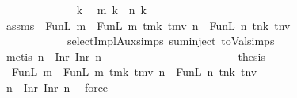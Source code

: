 \begin{isabellebody}
\ \ \ \ \ \ \ \ \ \ \ \ \isamarkupfalse%
\ k\ \isamarkupfalse%
\ {\isachardoublequoteopen}m{\isacharprime}{\kern0pt}{\isacharprime}{\kern0pt}\ k\ {\isacharequal}{\kern0pt}\ n{\isacharprime}{\kern0pt}{\isacharprime}{\kern0pt}\ k{\isachardoublequoteclose}\isanewline
\ \ \ \ \ \ \ \ \ \ \ \ \isamarkupfalse%
\ assms{\isacharparenleft}{\kern0pt}{}{\isacharparenright}{\kern0pt}\ {}\ FunL\ {\isacartoucheopen}m{\isacharprime}{\kern0pt}\ {\isacharequal}{\kern0pt}\ FunL\ m{\isacharprime}{\kern0pt}{\isacharprime}{\kern0pt}\ tmk\ tmv{\isacartoucheclose}\ {\isacartoucheopen}n{\isacharprime}{\kern0pt}\ {\isacharequal}{\kern0pt}\ FunL\ n{\isacharprime}{\kern0pt}{\isacharprime}{\kern0pt}\ tnk\ tnv{\isacartoucheclose}\isanewline
\ \ \ \ \ \ \ \ \ \ \ \ selectImplAux{\isachardot}{\kern0pt}simps{\isacharparenleft}{\kern0pt}{}{\isacharparenright}{\kern0pt}\ sum{\isachardot}{\kern0pt}inject{\isacharparenleft}{\kern0pt}{}{\isacharparenright}{\kern0pt}\ toVal{}{}{}{}{\isachardot}{\kern0pt}simps{\isacharparenleft}{\kern0pt}{}{\isacharparenright}{\kern0pt}\isanewline
\ \ \ \ \ \ \ \ \ \ \ \ \isamarkupfalse%
\ {\isacharparenleft}{\kern0pt}metis\ {\isacartoucheopen}n\ {\isacharequal}{\kern0pt}\ Inr\ {\isacharparenleft}{\kern0pt}Inr\ n{\isacharprime}{\kern0pt}{\isacharparenright}{\kern0pt}{\isacartoucheclose}{\isacharparenright}{\kern0pt}\isanewline
\ \ \ \ \ \ \ \ \ \ \isamarkupfalse%
\isanewline
\ \ \ \ \ \ \ \ \ \ \isamarkupfalse%
\ \isamarkupfalse%
\ {\isacharquery}{\kern0pt}thesis\ \isamarkupfalse%
\ {}\ FunL\ {\isacartoucheopen}m{\isacharprime}{\kern0pt}\ {\isacharequal}{\kern0pt}\ FunL\ m{\isacharprime}{\kern0pt}{\isacharprime}{\kern0pt}\ tmk\ tmv{\isacartoucheclose}\ {\isacartoucheopen}n{\isacharprime}{\kern0pt}\ {\isacharequal}{\kern0pt}\ FunL\ n{\isacharprime}{\kern0pt}{\isacharprime}{\kern0pt}\ tnk\ tnv{\isacartoucheclose}\isanewline
\ \ \ \ \ \ \ \ \ \ \ \ \isamarkupfalse%
\ {\isacartoucheopen}n\ {\isacharequal}{\kern0pt}\ Inr\ {\isacharparenleft}{\kern0pt}Inr\ n{\isacharprime}{\kern0pt}{\isacharparenright}{\kern0pt}{\isacartoucheclose}\ \isamarkupfalse%
\ force\isanewline
\ \ \ \ \ \ \ \ \isamarkupfalse%
\isanewline
\ \ \ \ \ \ \isamarkupfalse%
\isanewline
\ \ \ \ \isamarkupfalse%
\isanewline

\end{isabellebody}
